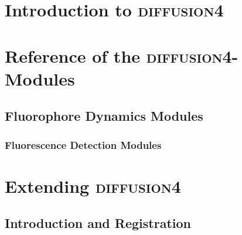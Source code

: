 \documentclass[a4paper,twoside,10pt]{report}
\newcommand{\df}{\textsc{diffusion4}\xspace}
\begin{document}
\chapter{Introduction to \df}
\label{sec:IntroductionToDf}



\chapter{Reference of the \df-Modules}
\label{sec:ReferenceOfTheDfModules}
\section{Fluorophore Dynamics Modules}
\label{sec:TrajectoryModules}

\subsection{Fluorescence Detection Modules}
\label{sec:DetectionModules}

\chapter{Extending \df}
\label{sec:ExtendingDf}
\section{Introduction and Registration}
\label{sec:IntroductionAndRegistration}
\end{document}
